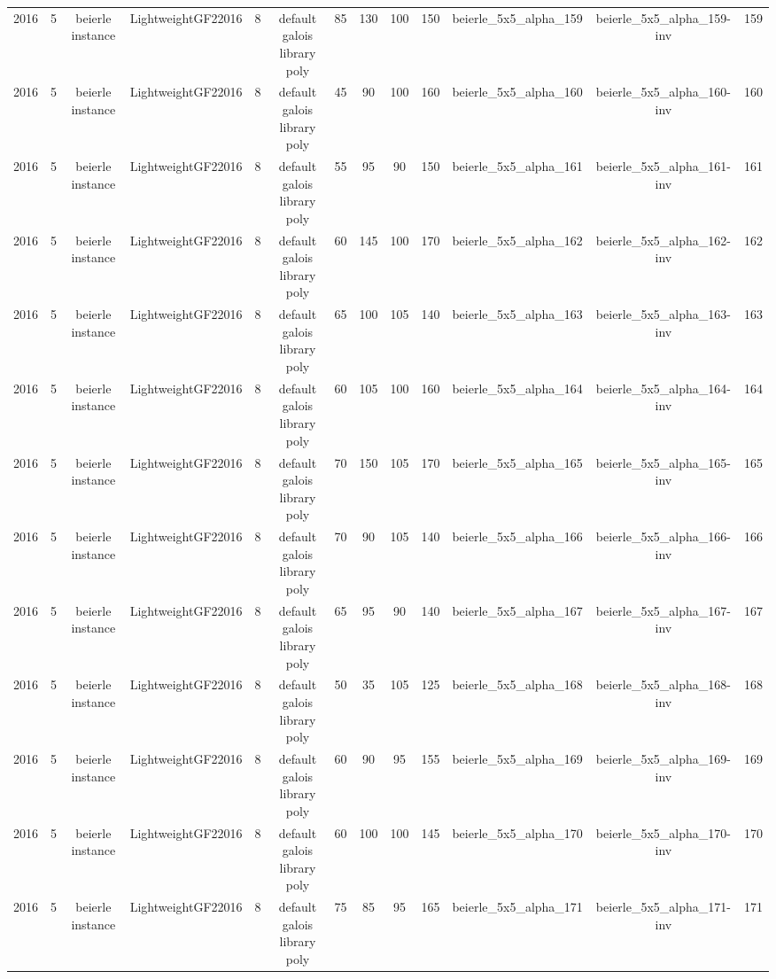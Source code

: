 \begin{tabular}{c c c c c c c c c c c c c}
2016 & 5 & beierle instance & LightweightGF22016 & 8 & default galois library poly & 85 & 130 & 100 & 150 & beierle_5x5_alpha_159 & beierle_5x5_alpha_159-inv & 159 \\
2016 & 5 & beierle instance & LightweightGF22016 & 8 & default galois library poly & 45 & 90 & 100 & 160 & beierle_5x5_alpha_160 & beierle_5x5_alpha_160-inv & 160 \\
2016 & 5 & beierle instance & LightweightGF22016 & 8 & default galois library poly & 55 & 95 & 90 & 150 & beierle_5x5_alpha_161 & beierle_5x5_alpha_161-inv & 161 \\
2016 & 5 & beierle instance & LightweightGF22016 & 8 & default galois library poly & 60 & 145 & 100 & 170 & beierle_5x5_alpha_162 & beierle_5x5_alpha_162-inv & 162 \\
2016 & 5 & beierle instance & LightweightGF22016 & 8 & default galois library poly & 65 & 100 & 105 & 140 & beierle_5x5_alpha_163 & beierle_5x5_alpha_163-inv & 163 \\
2016 & 5 & beierle instance & LightweightGF22016 & 8 & default galois library poly & 60 & 105 & 100 & 160 & beierle_5x5_alpha_164 & beierle_5x5_alpha_164-inv & 164 \\
2016 & 5 & beierle instance & LightweightGF22016 & 8 & default galois library poly & 70 & 150 & 105 & 170 & beierle_5x5_alpha_165 & beierle_5x5_alpha_165-inv & 165 \\
2016 & 5 & beierle instance & LightweightGF22016 & 8 & default galois library poly & 70 & 90 & 105 & 140 & beierle_5x5_alpha_166 & beierle_5x5_alpha_166-inv & 166 \\
2016 & 5 & beierle instance & LightweightGF22016 & 8 & default galois library poly & 65 & 95 & 90 & 140 & beierle_5x5_alpha_167 & beierle_5x5_alpha_167-inv & 167 \\
2016 & 5 & beierle instance & LightweightGF22016 & 8 & default galois library poly & 50 & 35 & 105 & 125 & beierle_5x5_alpha_168 & beierle_5x5_alpha_168-inv & 168 \\
2016 & 5 & beierle instance & LightweightGF22016 & 8 & default galois library poly & 60 & 90 & 95 & 155 & beierle_5x5_alpha_169 & beierle_5x5_alpha_169-inv & 169 \\
2016 & 5 & beierle instance & LightweightGF22016 & 8 & default galois library poly & 60 & 100 & 100 & 145 & beierle_5x5_alpha_170 & beierle_5x5_alpha_170-inv & 170 \\
2016 & 5 & beierle instance & LightweightGF22016 & 8 & default galois library poly & 75 & 85 & 95 & 165 & beierle_5x5_alpha_171 & beierle_5x5_alpha_171-inv & 171 \\

\end{tabular}
